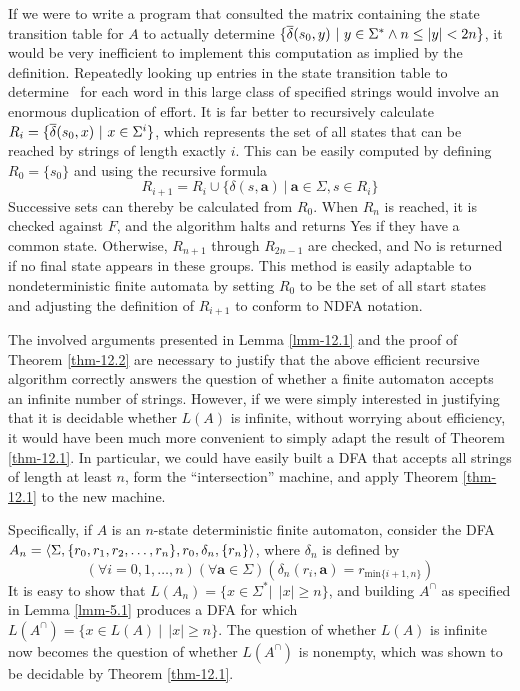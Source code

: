 If we were to write a program that consulted the matrix containing the state
transition table for $A$ to actually determine $\{\DBAR(s_0,y)\ |\ y\in\Sigma^*
\wedge n\leq |y| < 2n\}$, it would be very inefficient to implement this
computation as implied by the definition. Repeatedly looking up entries in the
state transition table to determine \DBAR\ for each word in this large class of
specified strings would involve an enormous duplication of effort. It is far
better to recursively calculate $R_i=\{\overline{\delta}(s_0,x)\ |\ x\in \Sigma^i\}$, which
represents the set of all states that can be reached by strings of length
exactly $i$. This can be easily computed by defining $R_0=\{s_0\}$ and using the
recursive formula
\[ R_{i+1}= R_i \cup \{\delta(s,\pmb{a})\ |\ \pmb{a}\in\Sigma,s\in R_i\} \]
Successive sets can thereby be calculated from $R_0$. When $R_n$ is reached, it
is checked against $F$, and the algorithm halts and returns Yes if they have a
common state. Otherwise, $R_{n+1}$ through $R_{2n-1}$ are checked, and No is
returned if no final state appears in these groups. This method is easily
adaptable to nondeterministic finite automata by setting $R_0$ to be the set of
all start states and adjusting the definition of $R_{i+1}$ to conform to NDFA
notation.

The involved arguments presented in Lemma \ref{lmm-12.1} and the proof of
Theorem \ref{thm-12.2} are necessary to justify that the above efficient
recursive algorithm correctly answers the question of whether a finite automaton
accepts an infinite number of strings. However, if we were simply interested in
justifying that it is decidable whether $L(A)$ is infinite, without worrying about efficiency, it would have been
much more convenient to simply adapt the result of Theorem \ref{thm-12.1}. In
particular, we could have easily built a DFA that accepts all strings of length
at least $n$, form the ``intersection'' machine, and apply Theorem \ref{thm-12.1} to the new machine.

Specifically, if $A$ is an $n$-state deterministic finite automaton, consider
the DFA $A_n=\langle\Sigma,\{r_0,r_1,r_2,\ldots,\\r_n\},r_0,\delta_{ n},\{r_n\}
\rangle$, where $\delta_{  n}$ is defined by
\[ (\forall i=0,1,\ldots,n)(\forall\pmb{a}\in\Sigma)(\delta_{  n}(r_i,\pmb{a})=
	r_{\text{min}\{i+1,n\}}) \]
It is easy to show that $L(A_n)=\{x\in\Sigma^* |\ \ |x|\geq n\}$, and building
$A^{\cap}$ as specified in Lemma \ref{lmm-5.1} produces a DFA for which $L(A^{\cap})=\{x
\in L(A)\ |\ \ |x|\geq n\}$. The question of whether $L(A)$ is infinite now becomes
the question of whether $L(A^{\cap})$ is nonempty, which was shown to be
decidable by Theorem \ref{thm-12.1}.

